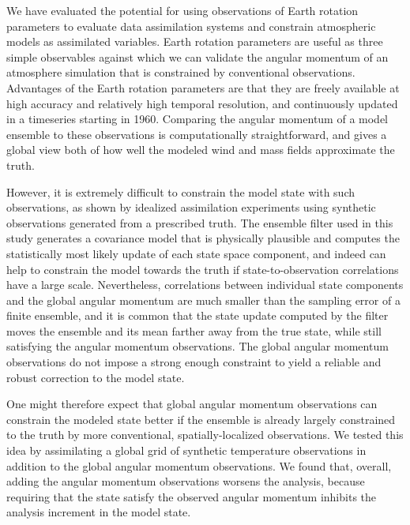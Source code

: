 We have evaluated the potential for using observations of Earth rotation parameters to evaluate data assimilation systems and constrain atmospheric models as assimilated variables.  
%
Earth rotation parameters are useful as three simple observables against which we can validate the angular momentum of an atmosphere simulation that is constrained by conventional observations.  
Advantages of the Earth rotation parameters are that they are freely available \citep{iers} at high accuracy and relatively high temporal resolution, and continuously updated in a timeseries starting in 1960. 
Comparing the angular momentum of a model ensemble to these observations is computationally straightforward, and 
gives a global view both of how well the modeled wind and mass fields approximate the truth.

However, it is extremely difficult to constrain the model state with such observations, as shown by 
idealized assimilation experiments using synthetic observations generated from a prescribed truth.
The ensemble filter used in this study generates a covariance model that is physically plausible and computes the statistically most likely update of each state space component, and indeed can help to constrain the model towards the truth if state-to-observation correlations have a large scale. 
Nevertheless, correlations between individual state components and the global angular momentum are much smaller than the sampling error of a finite ensemble, and it is common that 
the state update computed by the filter moves the ensemble and its mean farther away from the true state, while still satisfying the angular momentum observations. 
The global angular momentum observations do not impose a strong enough constraint to yield a reliable and robust correction to the model state. 

One might therefore expect that global angular momentum observations can constrain the modeled state better if the ensemble is already largely constrained to the truth by more conventional, spatially-localized observations. 
We tested this idea by assimilating a global grid of synthetic temperature observations in addition to the global angular momentum observations. 
We found that, overall, adding the angular momentum observations worsens the analysis, 
because requiring that the state satisfy the observed angular momentum inhibits the analysis increment in the model state.  

